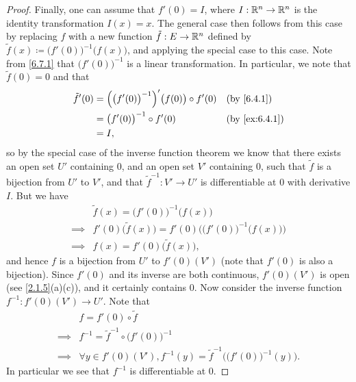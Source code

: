 \begin{proof}
  Finally, one can assume that \(f'(0) = I\), where \(I : \mathbb{R}^n \to \mathbb{R}^n\) is the identity transformation \(I(x) = x\).
  The general case then follows from this case by replacing \(f\) with a new function \(\tilde{f} : E \to \mathbb{R}^n\) defined by \(\tilde{f}(x) \coloneqq \big(f'(0)\big)^{-1} \big(f(x)\big)\), and applying the special case to this case.
  Note from \cref{6.7.1} that \(\big(f'(0)\big)^{-1}\) is a linear transformation.
  In particular, we note that \(\tilde{f}(0) = 0\) and that
  \begin{align*}
    \tilde{f}'(0) & = \Big(\big(f'(0)\big)^{-1}\Big)'\big(f(0)\big) \circ f'(0) &  & \by{6.4.1}    \\
                  & = \big(f'(0)\big)^{-1} \circ f'(0)                          &  & \by{ex:6.4.1} \\
                  & = I,
  \end{align*}
  so by the special case of the inverse function theorem we know that there exists an open set \(U'\) containing \(0\), and an open set \(V'\) containing \(0\), such that \(\tilde{f}\) is a bijection from \(U'\) to \(V'\), and that \(\tilde{f}^{-1} : V' \to U'\) is differentiable at \(0\) with derivative \(I\).
  But we have
  \begin{align*}
             & \tilde{f}(x) = \big(f'(0)\big)^{-1} \big(f(x)\big)                                 \\
    \implies & f'(0) \big(\tilde{f}(x)\big) = f'(0) \Big(\big(f'(0)\big)^{-1} \big(f(x)\big)\Big) \\
    \implies & f(x) = f'(0) \big(\tilde{f}(x)\big),
  \end{align*}
  and hence \(f\) is a bijection from \(U'\) to \(f'(0)(V')\)
  (note that \(f'(0)\) is also a bijection).
  Since \(f'(0)\) and its inverse are both continuous, \(f'(0)(V')\) is open (see \cref{2.1.5}(a)(c)), and it certainly contains \(0\).
  Now consider the inverse function \(f^{-1} : f'(0)(V') \to U'\).
  Note that
  \begin{align*}
             & f = f'(0) \circ \tilde{f}                                                             \\
    \implies & f^{-1} = \tilde{f}^{-1} \circ \big(f'(0)\big)^{-1}                                    \\
    \implies & \forall y \in f'(0)(V'), f^{-1}(y) = \tilde{f}^{-1}\Big(\big(f'(0)\big)^{-1}(y)\Big).
  \end{align*}
  In particular we see that \(f^{-1}\) is differentiable at \(0\).


\end{proof}
